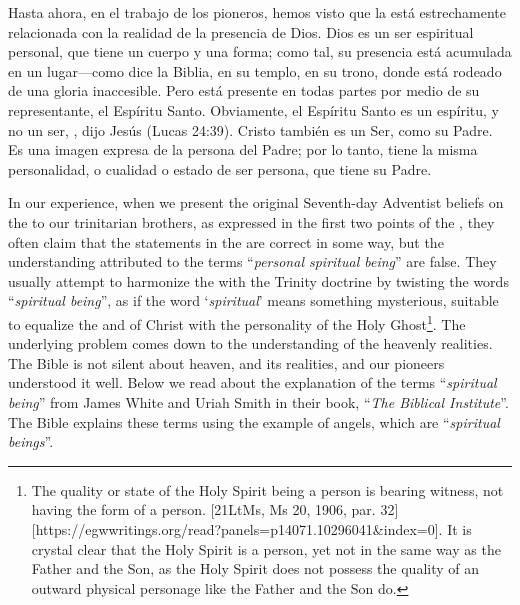 Hasta ahora, en el trabajo de los pioneros, hemos visto que la  está estrechamente relacionada con la realidad de la presencia de Dios. Dios es un ser espiritual personal, que tiene un cuerpo y una forma; como tal, su presencia está acumulada en un lugar—como dice la Biblia, en su templo, en su trono, donde está rodeado de una gloria inaccesible. Pero está presente en todas partes por medio de su representante, el Espíritu Santo. Obviamente, el Espíritu Santo es un espíritu, y no un ser, , dijo Jesús (Lucas 24:39). Cristo también es un Ser, como su Padre. Es una imagen expresa de la persona del Padre; por lo tanto, tiene la misma personalidad, o cualidad o estado de ser persona, que tiene su Padre.


In our experience, when we present the original Seventh-day Adventist beliefs on the  to our trinitarian brothers, as expressed in the first two points of the , they often claim that the statements in the  are correct in some way, but the understanding attributed to the terms “\textit{personal spiritual being}” are false. They usually attempt to harmonize the  with the Trinity doctrine by twisting the words “\textit{spiritual being}”, as if the word ‘\textit{spiritual}’ means something mysterious, suitable to equalize the  and of Christ with the personality of the Holy Ghost\footnote{The quality or state of the Holy Spirit being a person is bearing witness, not having the form of a person. [21LtMs, Ms 20, 1906, par. 32][https://egwwritings.org/read?panels=p14071.10296041&index=0]. It is crystal clear that the Holy Spirit is a person, yet not in the same way as the Father and the Son, as the Holy Spirit does not possess the quality of an outward physical personage like the Father and the Son do.}. The underlying problem comes down to the understanding of the heavenly realities. The Bible is not silent about heaven, and its realities, and our pioneers understood it well. Below we read about the explanation of the terms “\textit{spiritual being}” from James White and Uriah Smith in their book, “\textit{The Biblical Institute}”. The Bible explains these terms using the example of angels, which are “\textit{spiritual beings}”.


